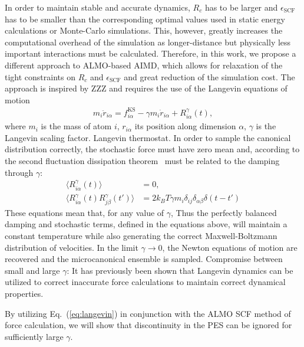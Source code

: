 \documentclass[aps,prl,reprint,amsmath,amssymb]{revtex4-1}
\begin{document}
In order to maintain stable and accurate dynamics, $R_{c}$ has to be larger and $\epsilon_{\text{SCF}}$ has to be smaller than the corresponding optimal values used in static energy calculations or Monte-Carlo simulations. 
This, however, greatly increases the computational overhead of the simulation as longer-distance but physically less important interactions must be calculated. 
Therefore, in this work, we propose a different approach to ALMO-based AIMD, which allows for relaxation of the tight constraints on $R_{c}$ and $\epsilon_{\text{SCF}}$ and great reduction of the simulation cost. The approach is inspired by ZZZ and requires the use of the Langevin equations of motion~\cite{a:Kubo-1986}
%
\begin{align}
\label{eq:langevin}
m_i \ddot{r}_{i\alpha} = f^{\text{KS}}_{i\alpha} - \gamma m_i \dot{r}_{i\alpha} + R^{\gamma}_{i\alpha} (t),
\end{align}
%
where $m_i$ is the mass of atom $i$, $r_{i\alpha}$ its position along dimension $\alpha$, $\gamma$ is the Langevin scaling factor.
Langevin thermostat. In order to sample the canonical distribution correctly, the stochastic force must have zero mean and, according to the second fluctuation dissipation theorem~\cite{a:Kubo-1986,b:tuckerman-stat} must be related to the damping through $\gamma$:
%
\begin{align}
\label{eq:stochastic}
\langle R^{\gamma}_{i\alpha} (t) \rangle &= 0, \\
\langle R^{\gamma}_{i\alpha} (t)  R^{\gamma}_{j\beta} (t') \rangle &= 2 k_B T \gamma m_i \delta_{ij} \delta_{\alpha\beta} \delta(t-t')
\end{align}
%
These equations mean that, for any value of $\gamma$, 
Thus the perfectly balanced damping and stochastic terms, defined in the equations above, will maintain a constant temperature while also generating the correct Maxwell-Boltzmann distribution of velocities. In the limit $\gamma \rightarrow 0$, the Newton equations of motion are recovered and the microcanonical ensemble is sampled.
Compromise between small and large $\gamma$: It has previously been shown that Langevin dynamics can be utilized to correct inaccurate force calculations to maintain correct dynamical properties.~\cite{a:langevin-why,a:2ndcpmd,b:tuckerman-stat,a:ceriotti} 

By utilizing Eq.\ (\ref{eq:langevin}) in conjunction with the ALMO SCF method of force calculation, we will show that discontinuity in the PES can be ignored for sufficiently large $\gamma$. 
\end{document}

